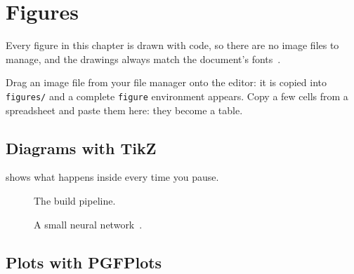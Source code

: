 \chapter{Figures}
\label{chap:figures}

Every figure in this chapter is drawn with code, so there are no image files to
manage, and the drawings always match the document's fonts~\cite{tantau2023}.

\begin{tryit}
  Drag an image file from your file manager onto the editor: it is copied into
  \texttt{figures/} and a complete \texttt{figure} environment appears. Copy a
  few cells from a spreadsheet and paste them here: they become a table.
\end{tryit}

\section{Diagrams with TikZ}

 shows what happens inside \rutex{} every time you pause.

\begin{figure}[htbp]
  \centering
  
  \caption{The \rutex{} build pipeline.}
  \label{fig:pipeline}
\end{figure}

\begin{figure}[htbp]
  \centering
  \caption{A small neural network~\cite{vaswani2017}.}
  \label{fig:network}
\end{figure}

\section{Plots with PGFPlots}

